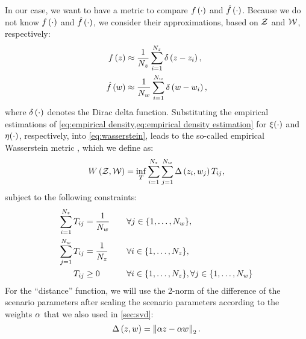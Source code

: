In our case, we want to have a metric to compare $f\left( \cdot \right)$ and $\hat{f}\left( \cdot \right)$.
Because we do not know $f\left( \cdot \right)$ and $\hat{f}\left( \cdot \right)$, we consider their approximations, based on $\mathcal{Z}$ and $\mathcal{W}$, respectively:
\begin{align}
	f\left( z \right) &\approx
	\frac{1}{N_z} \sum_{i=1}^{N_z}
	\delta\left(z - z_{i}\right), \label{eq:empirical density}\\
	\hat{f}\left( w \right) &\approx
	\frac{1}{N_w} \sum_{i=1}^{N_w}
	\delta\left(w - w_{i}\right), \label{eq:empirical density estimation}
\end{align}
where $\delta\left(\cdot\right)$ denotes the Dirac delta function.
Substituting the empirical estimations of \cref{eq:empirical density,eq:empirical density estimation} for $\xi(\cdot)$ and $\eta(\cdot)$, respectively, into \cref{eq:wasserstein}, leads to the so-called empirical Wasserstein metric \autocite{sommerfeld2018inference}, which we define as:
\begin{equation}
	\label{eq:empirical wasserstein}
	W\left(\mathcal{Z},\mathcal{W}\right)
	= \inf_{T} 
	\sum_{i=1}^{N_z} \sum_{j=1}^{N_w} 
	\Delta\left(z_{i},w_{j}\right)
	T_{i j},
\end{equation}
subject to the following constraints:
\begin{alignat}{2}
	\sum_{i=1}^{N_z} T_{i j} &= \frac{1}{N_w} \quad && \forall j \in \{1,\ldots,N_w\}, \\
	\sum_{j=1}^{N_w} T_{i j} &= \frac{1}{N_z} \quad && \forall i \in \{1,\ldots,N_z\}, \\
	T_{i j} &\geq 0 \quad && \forall i \in \{1,\ldots,N_z\}, \forall j \in \{1,\ldots,N_w\}
\end{alignat}
For the ``distance'' function, we will use the 2-norm of the difference of the scenario parameters after scaling the scenario parameters according to the weights $\alpha$ that we also used in \cref{sec:svd}:
\begin{equation}
	\Delta\left(z,w\right) = \left\Vert \alpha z - \alpha w \right\Vert_2.
\end{equation}



